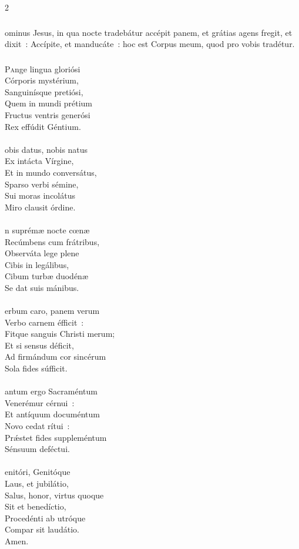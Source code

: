 \documentclass[9pt,twoside]{extarticle}
\begin{document}
\begin{multicols}{2}
{{\subsubsection*{}
ominus Jesus, in qua nocte tradebátur accépit panem, et grátias agens fregit, et dixit~: Accípite, et manducáte~: hoc est Corpus meum, quod pro vobis tradétur.

\subsubsection*{\center{}}
\lettrine{P}ange lingua gloriósi\\ 
Córporis mystérium,\\ 
Sanguinísque pretiósi,\\ 
Quem in mundi prétium\\ 
Fructus ventris generósi\\ 
Rex effúdit Géntium.\\ 
\\
obis datus, nobis natus\\ 
Ex intácta Vírgine,\\ 
Et in mundo conversátus,\\ 
Sparso verbi sémine,\\ 
Sui moras incolátus\\ 
Miro clausit órdine.\\ 
\\
n suprémæ nocte cœnæ\\ 
Recúmbens cum frátribus,\\ 
Observáta lege plene\\ 
Cibis in legálibus,\\ 
Cibum turbæ duodénæ\\ 
Se dat suis mánibus.\\ 
\\
erbum caro, panem verum\\ 
Verbo carnem éfficit~:\\ 
Fitque sanguis Christi merum;\\ 
Et si sensus déficit,\\ 
Ad firmándum cor sincérum\\ 
Sola fides súfficit.\\ 
\\
antum ergo Sacraméntum\\ 
Venerémur cérnui~:\\ 
Et antíquum documéntum\\ 
Novo cedat rítui~:\\ 
Prǽstet fides suppleméntum\\ 
Sénsuum deféctui.\\ 
\\
enitóri, Genitóque\\ 
Laus, et jubilátio,\\ 
Salus, honor, virtus quoque\\ 
Sit et benedíctio,\\ 
Procedénti ab utróque\\ 
Compar sit laudátio.\\
Amen.

}}
\end{multicols}
\end{document}
